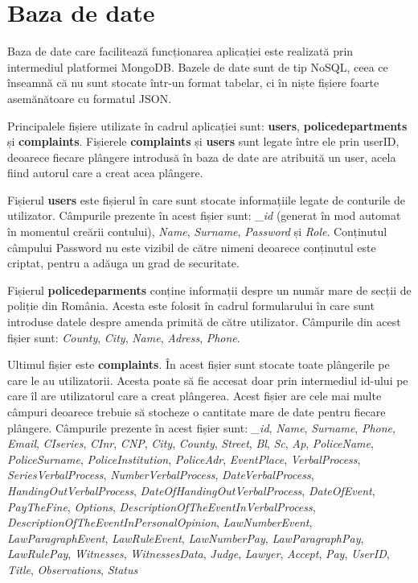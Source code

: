 \documentclass[12pt,a4paper]{report}
\theoremstyle{definition}
\theoremstyle{remark}
\begin{document}
\section{Baza de date}
\vspace{20pt}
Baza de date care facilitează funcționarea aplicației este realizată prin intermediul platformei MongoDB. Bazele de date sunt de tip NoSQL, ceea ce înseamnă că nu sunt stocate într-un format tabelar, ci în niște fișiere foarte asemănătoare cu formatul JSON.

Principalele fișiere utilizate în cadrul aplicației sunt: \textbf{users}, \textbf{policedepartments} și \textbf{complaints}. Fișierele \textbf{complaints} și \textbf{users} sunt legate între ele prin userID, deoarece fiecare plângere introdusă în baza de date are atribuită un user, acela fiind autorul care a creat acea plângere.

Fișierul \textbf{users} este fișierul în care sunt stocate informațiile legate de conturile de utilizator. Câmpurile prezente în acest fișier sunt: \emph{\_id} (generat în mod automat în momentul creării contului), \emph{Name}, \emph{Surname}, \emph{Password} și \emph{Role}. Conținutul câmpului Password nu este vizibil de către nimeni deoarece conținutul este criptat, pentru a adăuga un grad de securitate.

Fișierul \textbf{policedeparments} conține informații despre un număr mare de secții de poliție din România. Acesta este folosit în cadrul formularului în care sunt introduse datele despre amenda primită de către utilizator. Câmpurile din acest fișier sunt: \emph{County}, \emph{City}, \emph{Name}, \emph{Adress}, \emph{Phone}.

Ultimul fișier este \textbf{complaints}. În acest fișier sunt stocate toate plângerile pe care le au utilizatorii. Acesta poate să fie accesat doar prin intermediul id-ului pe care îl are utilizatorul care a creat plângerea. Acest fișier are cele mai multe câmpuri deoarece trebuie să stocheze o cantitate mare de date pentru fiecare plângere. Câmpurile prezente în acest fișier sunt: \emph{\_id}, \emph{Name}, \emph{Surname}, \emph{Phone}, \emph{Email}, \emph{CIseries}, \emph{CInr}, \emph{CNP}, \emph{City}, \emph{County}, \emph{Street}, \emph{Bl}, \emph{Sc}, \emph{Ap}, \emph{PoliceName}, \emph{PoliceSurname}, \emph{PoliceInstitution}, \emph{PoliceAdr}, \emph{EventPlace}, \emph{VerbalProcess}, \emph{SeriesVerbalProcess}, \emph{NumberVerbalProcess}, \emph{DateVerbalProcess}, \emph{HandingOutVerbalProcess}, \emph{DateOfHandingOutVerbalProcess}, \emph{DateOfEvent}, \emph{PayTheFine}, \emph{Options}, \emph{DescriptionOfTheEventInVerbalProcess}, \emph{DescriptionOfTheEventInPersonalOpinion}, \emph{LawNumberEvent}, \emph{LawParagraphEvent}, \emph{LawRuleEvent}, \emph{LawNumberPay}, \emph{LawParagraphPay}, \emph{LawRulePay}, \emph{Witnesses}, \emph{WitnessesData}, \emph{Judge}, \emph{Lawyer}, \emph{Accept}, \emph{Pay}, \emph{UserID}, \emph{Title}, \emph{Observations}, \emph{Status}
\end{document}
